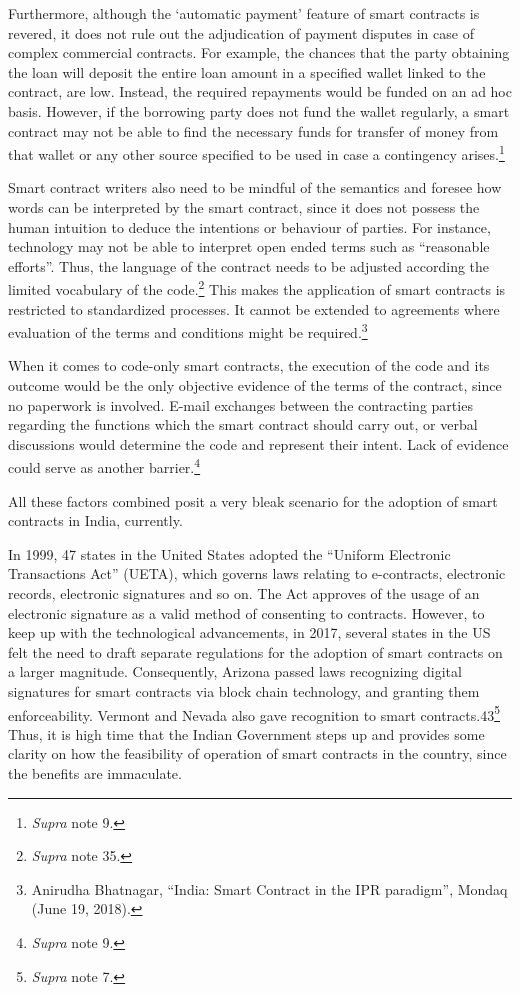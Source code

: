 \begin{multicols}{2}
\noi
Furthermore, although the ‘automatic payment’ feature of smart contracts is revered, it does
not rule out the adjudication of payment disputes in case of complex commercial contracts.
For example, the chances that the party obtaining the loan will deposit the entire loan amount
in a specified wallet linked to the contract, are low. Instead, the required repayments would
be funded on an ad hoc basis. However, if the borrowing party does not fund the wallet
regularly, a smart contract may not be able to find the necessary funds for transfer of money
from that wallet or any other source specified to be used in case a contingency arises.\footnote{\textit{Supra} note 9.}

\noi
Smart contract writers also need to be mindful of the semantics and foresee how words can be
interpreted by the smart contract, since it does not possess the human intuition to deduce the
intentions or behaviour of parties. For instance, technology may not be able to interpret open
ended terms such as “reasonable efforts”. Thus, the language of the contract needs to be
adjusted according the limited vocabulary of the code.\footnote{\textit{Supra} note 35.} This makes the application of smart contracts is restricted to standardized processes. It cannot be extended to agreements where
evaluation of the terms and conditions might be required.\footnote{Anirudha Bhatnagar, “India: Smart Contract in the IPR paradigm”, Mondaq (June 19, 2018). }

\noi
When it comes to code-only smart contracts, the execution of the code and its outcome would
be the only objective evidence of the terms of the contract, since no paperwork is involved.
E-mail exchanges between the contracting parties regarding the functions which the smart
contract should carry out, or verbal discussions would determine the code and represent their
intent. Lack of evidence could serve as another barrier.\footnote{\textit{Supra} note 9.}

\noi
All these factors combined posit a very bleak scenario for the adoption of smart contracts in
India, currently. 


\noi
In 1999, 47 states in the United States adopted the “Uniform Electronic Transactions Act”
(UETA), which governs laws relating to e-contracts, electronic records, electronic signatures
and so on. The Act approves of the usage of an electronic signature as a valid method of
consenting to contracts. However, to keep up with the technological advancements, in 2017,
several states in the US felt the need to draft separate regulations for the adoption of smart
contracts on a larger magnitude. Consequently, Arizona passed laws recognizing digital
signatures for smart contracts via block chain technology, and granting them enforceability.
Vermont and Nevada also gave recognition to smart contracts.43\footnote{\textit{Supra} note 7.} Thus, it is high time that the
Indian Government steps up and provides some clarity on how the feasibility of operation of
smart contracts in the country, since the benefits are immaculate. 


\end{multicols}
